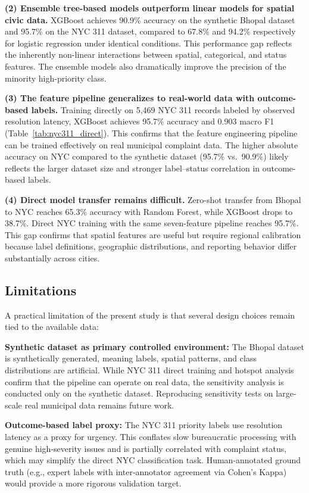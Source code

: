 \documentclass[conference]{IEEEtran}
\begin{document}
\textbf{(2) Ensemble tree-based models outperform linear models for spatial civic data.} XGBoost achieves 90.9\% accuracy on the synthetic Bhopal dataset and 95.7\% on the NYC 311 dataset, compared to 67.8\% and 94.2\% respectively for logistic regression under identical conditions. This performance gap reflects the inherently non-linear interactions between spatial, categorical, and status features. The ensemble models also dramatically improve the precision of the minority high-priority class.

\textbf{(3) The feature pipeline generalizes to real-world data with outcome-based labels.} Training directly on 5,469 NYC 311 records labeled by observed resolution latency, XGBoost achieves 95.7\% accuracy and 0.903 macro F1 (Table~\ref{tab:nyc311_direct}). This confirms that the feature engineering pipeline can be trained effectively on real municipal complaint data. The higher absolute accuracy on NYC compared to the synthetic dataset (95.7\% vs.\ 90.9\%) likely reflects the larger dataset size and stronger label--status correlation in outcome-based labels.

\textbf{(4) Direct model transfer remains difficult.} Zero-shot transfer from Bhopal to NYC reaches 65.3\% accuracy with Random Forest, while XGBoost drops to 38.7\%. Direct NYC training with the same seven-feature pipeline reaches 95.7\%. This gap confirms that spatial features are useful but require regional calibration because label definitions, geographic distributions, and reporting behavior differ substantially across cities.

\subsection{Limitations}

A practical limitation of the present study is that several design choices remain tied to the available data:

\textbf{Synthetic dataset as primary controlled environment:} The Bhopal dataset is synthetically generated, meaning labels, spatial patterns, and class distributions are artificial. While NYC 311 direct training and hotspot analysis confirm that the pipeline can operate on real data, the sensitivity analysis is conducted only on the synthetic dataset. Reproducing sensitivity tests on large-scale real municipal data remains future work.

\textbf{Outcome-based label proxy:} The NYC 311 priority labels use resolution latency as a proxy for urgency. This conflates slow bureaucratic processing with genuine high-severity issues and is partially correlated with complaint status, which may simplify the direct NYC classification task. Human-annotated ground truth (e.g., expert labels with inter-annotator agreement via Cohen's Kappa) would provide a more rigorous validation target.
\end{document}

